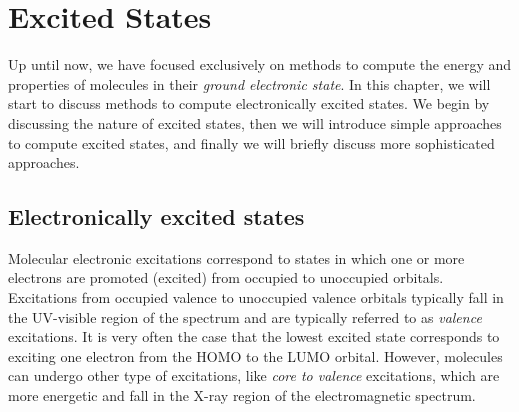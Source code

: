 \documentclass[../Main/notes.tex]{subfiles}
\begin{document}
\chapter{Excited States}

Up until now, we have focused exclusively on methods to compute the energy and properties of molecules in their \emph{ground electronic state}.
In this chapter, we will start to discuss methods to compute electronically excited states.
We begin by discussing the nature of excited states, then we will introduce simple approaches to compute excited states, and finally we will briefly discuss more sophisticated approaches.

\section{Electronically excited states}
Molecular electronic excitations correspond to states in which one or more electrons are promoted (excited) from occupied to unoccupied orbitals.
Excitations from occupied valence to unoccupied valence orbitals typically fall in the UV-visible region of the spectrum and are typically referred to as \emph{valence} excitations.
It is very often the case that the lowest excited state corresponds to exciting one electron from the HOMO to the LUMO orbital.
However, molecules can undergo other type of excitations, like \emph{core to valence} excitations, which are more energetic and fall in the X-ray region of the electromagnetic spectrum.
\end{document}

